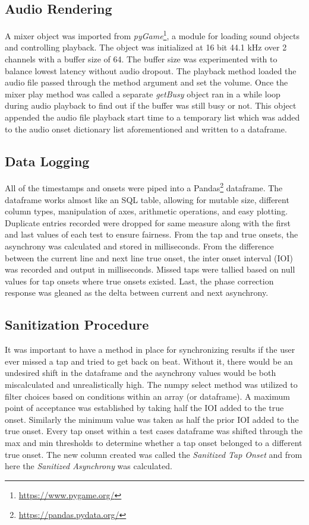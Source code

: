 \subsection{Audio Rendering}
A mixer object was imported from \textit{pyGame}\footnote{\url{https://www.pygame.org/}}, a module for loading sound objects and controlling playback. The object was initialized at 16 bit 44.1 kHz over 2 channels with a buffer size of 64. The buffer size was experimented with to balance lowest latency without audio dropout. The playback method loaded the audio file passed through the method argument and set the volume. Once the mixer play method was called a separate \textit{getBusy} object ran in a while loop during audio playback to find out if the buffer was still busy or not. This object appended the audio file playback start time to a temporary list which was added to the audio onset dictionary list aforementioned and written to a dataframe.
\subsection{Data Logging}
All of the timestamps and onsets were piped into a Pandas\footnote{\url{https://pandas.pydata.org/}} dataframe. The dataframe works almost like an SQL table, allowing for mutable size, different column types, manipulation of axes, arithmetic operations, and easy plotting. Duplicate entries recorded were dropped for same measure along with the first and last values of each test to ensure fairness. From the tap and true onsets, the asynchrony was calculated and stored in milliseconds. From the difference between the current line and next line true onset, the inter onset interval (IOI) was recorded and output in milliseconds. Missed taps were tallied based on null values for tap onsets where true onsets existed. Last, the phase correction response was gleaned as the delta between current and next asynchrony.
\subsection{Sanitization Procedure}\label{sanitizationProcedure}
It was important to have a method in place for synchronizing results if the user ever missed a tap and tried to get back on beat. Without it, there would be an undesired shift in the dataframe and the asynchrony values would be both miscalculated and unrealistically high. The numpy select method was utilized to filter choices based on conditions within an array (or dataframe). A maximum point of acceptance was established by taking half the IOI added to the true onset. Similarly the minimum value was taken as half the prior IOI added to the true onset. Every tap onset within a test cases dataframe was shifted through the max and min thresholds to determine whether a tap onset belonged to a different true onset. The new column created was called the \textit{Sanitized Tap Onset} and from here the \textit{Sanitized Asynchrony} was calculated.

